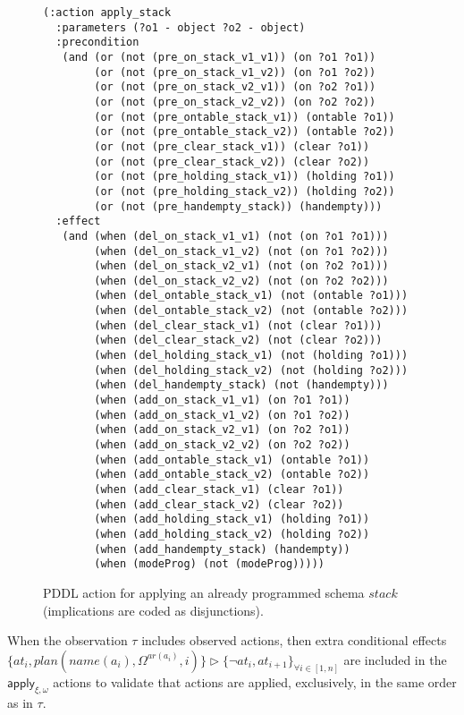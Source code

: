 \documentclass[letterpaper]{article} %
\begin{document}
\begin{itemize}
\begin{enumerate}
\begin{figure}
\begin{scriptsize}
\begin{verbatim}
(:action apply_stack
  :parameters (?o1 - object ?o2 - object)
  :precondition
   (and (or (not (pre_on_stack_v1_v1)) (on ?o1 ?o1))
        (or (not (pre_on_stack_v1_v2)) (on ?o1 ?o2))
        (or (not (pre_on_stack_v2_v1)) (on ?o2 ?o1))
        (or (not (pre_on_stack_v2_v2)) (on ?o2 ?o2))
        (or (not (pre_ontable_stack_v1)) (ontable ?o1))
        (or (not (pre_ontable_stack_v2)) (ontable ?o2))
        (or (not (pre_clear_stack_v1)) (clear ?o1))
        (or (not (pre_clear_stack_v2)) (clear ?o2))
        (or (not (pre_holding_stack_v1)) (holding ?o1))
        (or (not (pre_holding_stack_v2)) (holding ?o2))
        (or (not (pre_handempty_stack)) (handempty)))
  :effect
   (and (when (del_on_stack_v1_v1) (not (on ?o1 ?o1)))
        (when (del_on_stack_v1_v2) (not (on ?o1 ?o2)))
        (when (del_on_stack_v2_v1) (not (on ?o2 ?o1)))
        (when (del_on_stack_v2_v2) (not (on ?o2 ?o2)))
        (when (del_ontable_stack_v1) (not (ontable ?o1)))
        (when (del_ontable_stack_v2) (not (ontable ?o2)))
        (when (del_clear_stack_v1) (not (clear ?o1)))
        (when (del_clear_stack_v2) (not (clear ?o2)))
        (when (del_holding_stack_v1) (not (holding ?o1)))
        (when (del_holding_stack_v2) (not (holding ?o2)))
        (when (del_handempty_stack) (not (handempty)))
        (when (add_on_stack_v1_v1) (on ?o1 ?o1))
        (when (add_on_stack_v1_v2) (on ?o1 ?o2))
        (when (add_on_stack_v2_v1) (on ?o2 ?o1))
        (when (add_on_stack_v2_v2) (on ?o2 ?o2))
        (when (add_ontable_stack_v1) (ontable ?o1))
        (when (add_ontable_stack_v2) (ontable ?o2))
        (when (add_clear_stack_v1) (clear ?o1))
        (when (add_clear_stack_v2) (clear ?o2))
        (when (add_holding_stack_v1) (holding ?o1))
        (when (add_holding_stack_v2) (holding ?o2))
        (when (add_handempty_stack) (handempty))
        (when (modeProg) (not (modeProg)))))
\end{verbatim}
\end{scriptsize}
 \caption{\small PDDL action for applying an already programmed schema $stack$ (implications are coded as disjunctions).}
\label{fig:compilation}
\end{figure}
When the observation $\tau$ includes observed actions, then extra conditional effects $\{at_{i},plan(name(a_i),\Omega^{ar(a_i)},i)\}\rhd\{\neg at_{i},at_{i+1}\}_{\forall i\in [1,n]}$ are included in the $\mathsf{apply_{\xi,\omega}}$ actions to validate that actions are applied, exclusively, in the same order as in $\tau$.\\


\end{enumerate}
\end{itemize}
\end{document}
